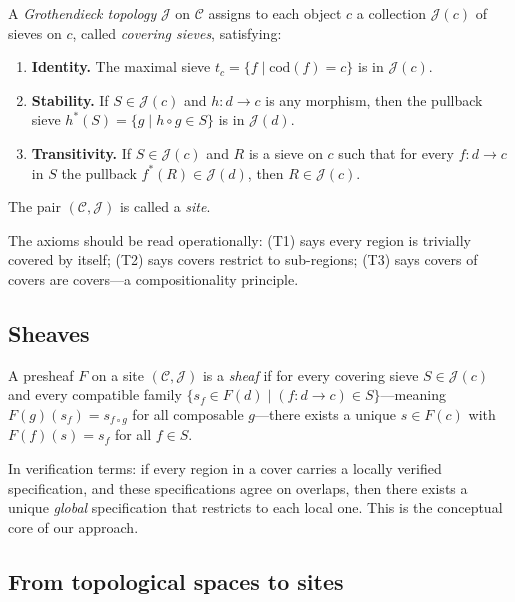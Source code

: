 \documentclass[11pt]{article}
\begin{document}
\begin{definition}\label{def:topology}
A \emph{Grothendieck topology} $\mathscr{J}$ on $\mathcal{C}$ assigns to each
object $c$ a collection $\mathscr{J}(c)$ of sieves on $c$, called
\emph{covering sieves}, satisfying:
\begin{enumerate}[label=(T\arabic*),nosep]
  \item \textbf{Identity.} The maximal sieve
        $t_c = \{f \mid \mathrm{cod}(f) = c\}$ is in $\mathscr{J}(c)$.
  \item \textbf{Stability.} If $S \in \mathscr{J}(c)$ and
        $h \colon d \to c$ is any morphism, then the pullback sieve
        $h^*(S) = \{g \mid h \circ g \in S\}$ is in $\mathscr{J}(d)$.
  \item \textbf{Transitivity.} If $S \in \mathscr{J}(c)$ and $R$ is a
        sieve on $c$ such that for every $f \colon d \to c$ in $S$ the
        pullback $f^*(R) \in \mathscr{J}(d)$, then $R \in \mathscr{J}(c)$.
\end{enumerate}
The pair $(\mathcal{C}, \mathscr{J})$ is called a \emph{site}.
\end{definition}

The axioms should be read operationally: (T1) says every region is trivially
covered by itself; (T2) says covers restrict to sub-regions; (T3) says covers
of covers are covers---a compositionality principle.

\subsection{Sheaves}

\begin{definition}[Sheaf]\label{def:sheaf}
A presheaf $F$ on a site $(\mathcal{C}, \mathscr{J})$ is a \emph{sheaf} if
for every covering sieve $S \in \mathscr{J}(c)$ and every compatible family
$\{s_f \in F(d) \mid (f \colon d \to c) \in S\}$---meaning
$F(g)(s_f) = s_{f \circ g}$ for all composable $g$---there exists a unique
$s \in F(c)$ with $F(f)(s) = s_f$ for all $f \in S$.
\end{definition}

In verification terms: if every region in a cover carries a locally verified
specification, and these specifications agree on overlaps, then there exists a
unique \emph{global} specification that restricts to each local one.  This is
the conceptual core of our approach.

\subsection{From topological spaces to sites}
\end{document}

